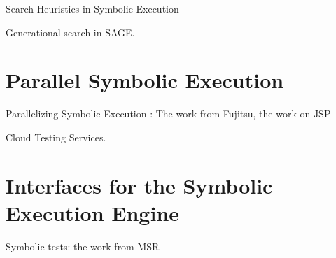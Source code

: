 Search Heuristics in Symbolic Execution

Generational search in SAGE.


\section{Parallel Symbolic Execution}
\label{sec:relwork:parallel}

Parallelizing Symbolic Execution : The work from Fujitsu, the work on JSP

Cloud Testing Services.


\section{Interfaces for the Symbolic Execution Engine}
\label{sec:relwork:ifaces}

Symbolic tests: the work from MSR


